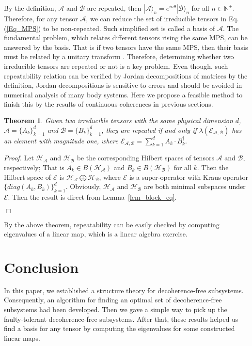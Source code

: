 \documentclass[journal]{IEEEtran}
\def\h{\ensuremath{\mathcal{H}}}
\def\a{\ensuremath{\mathcal{A}}}
\def\b{\ensuremath{\mathcal{B}}}
\def\e{\ensuremath{\mathcal{E}}}
\newtheorem{theorem}{Theorem}
\begin{document}
By the definition, $\a$ and $\b$ are repeated, then $|\a\rangle_{n}=e^{in\theta}|\b\rangle_{n}$ for all $n\in \mathbb{N^+}$. Therefore, for any tensor $\a$, we can reduce the set of irreducible tensors  in Eq.(\ref{Eq_MPS}) to be non-repeated. Such simplified set is called a basis of $\a$. The fundamental problem, which relates different tensors rising the same MPS, can be answered by the basis. That is if two tensors have the same MPS, then their basis must be related by a unitary transform \cite{cuevas2017irreducible}. Therefore, determining whether two irreducible tensors are  repeated or not  is a key problem. Even though, such repeatability relation can be verified by Jordan decompositions of matrices by the definition, Jordan decompositions is sensitive to errors and should be avoided in numerical analysis of many body systems. Here we propose a feasible method to finish this by the results of continuous coherences in previous sections. 
\begin{theorem}
  Given two irreducible tensors with the same physical dimension $d$, $\a=\{A_{k}\}_{k=1}^{d}$ and $\b=\{B_{k}\}_{k=1}^{d}$, they are repeated if and only if $\lambda(\e_{\a,\b})$ has an element with magnitude one, where $\e_{\a,\b}=\sum_{k=1}^d A_{k}\cdot B_{k}^\dagger.$
\end{theorem}
{\it Proof.} Let $\h_\a$ and $\h_\b$ be the corresponding Hilbert spaces of tensors $\a$ and $\b$, respectively; That is $A_k\in B(\h_\a)$ and $B_k\in B(\h_\b)$ for all $k$.  Then  the  Hilbert space of $\e$ is $\h_\a\bigoplus \h_\b$, where $\e$ is a super-operator with Kraus operator $\{diag(A_k,B_k)\}_{k=1}^d$. Obviously, $\h_\a$ and $\h_\b$ are both minimal subspaces under $\e$. Then the result is direct from Lemma~\ref{lem_block_eq}. 

\hfill $\Box$

By the above theorem, repeatability  can be easily checked by computing eigenvalues of a linear map, which is a linear algebra exercise.  
\section{Conclusion}
In this paper, we established a structure theory for decoherence-free subsystems. Consequently, an algorithm for finding an optimal set of decoherence-free subsystems had been developed. Then we gave a simple way to pick up the faulty-tolerant decoherence-free subsystems. After that, these results helped us find a basis for any tensor by computing the eigenvalues for some constructed linear maps. 
\end{document}
